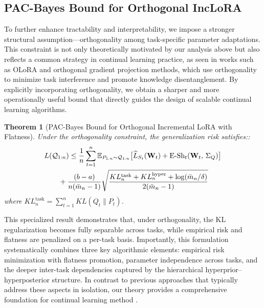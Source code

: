 \documentclass[letterpaper]{article} %
\newtheorem{theorem}{Theorem}
\begin{document}
\subsection{PAC-Bayes Bound for Orthogonal IncLoRA}



To further enhance tractability and interpretability, we impose a stronger structural assumption—orthogonality among task-specific parameter adaptations. This constraint is not only theoretically motivated by our analysis above but also reflects a common strategy in continual learning practice, as seen in works such as OLoRA and orthogonal gradient projection methods, which use orthogonality to minimize task interference and promote knowledge disentanglement. By explicitly incorporating orthogonality, we obtain a sharper and more operationally useful bound that directly guides the design of scalable continual learning algorithms.


\begin{theorem}[PAC-Bayes Bound for Orthogonal Incremental LoRA with Flatness]
Under the orthogonality constraint, the generalization risk satisfies::
\begin{align}
      &  L(\mathcal{Q}_{1:n}) \leq  \frac{1}{n} \sum_{t=1}^{n}
        \mathbb{E}_{P_{1:n} \sim \mathcal{Q}_{1:n}}\big[
            \widehat{L}_{S_t}(\mathbf{W}_{t}) \notag
 + \text{E-Sh}_t(\mathbf{W}_{t} ,\, \Sigma_Q)
        \big] \notag\\
&  \qquad + \frac{(b-a) }{n(\bar{m}_n - 1)}\sqrt{
            \frac{KL_{n}^{\text{task}} + KL_{n}^{\text{hyper}} +\log(\bar{m}_{n}/\delta)}{2(\bar{m}_{n} - 1)}
        }
\end{align}
where $KL^{\text{task}}_n = \sum_{t=1}^n KL(Q_t \| P_t) $.
\end{theorem}

This specialized result demonstrates that, under orthogonality, the KL regularization becomes fully separable across tasks, while empirical risk and flatness are penalized on a per-task basis. Importantly, this formulation systematically combines three key algorithmic elements: empirical risk minimization with flatness promotion, parameter independence across tasks, and the deeper inter-task dependencies captured by the hierarchical hyperprior–hyperposterior structure. In contrast to previous approaches that typically address these aspects in isolation, our theory provides a comprehensive foundation for continual learning method .
\end{document}
